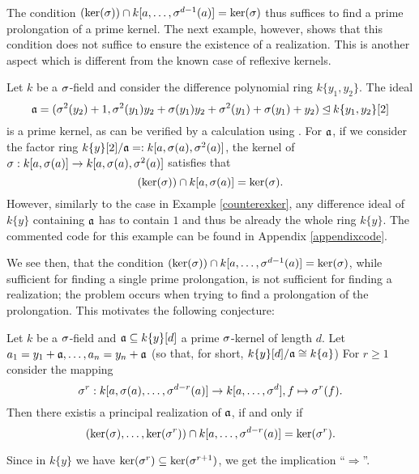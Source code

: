 The condition $(\operatorname{ker}(\sigma)) \cap k[a,\ldots,\sigma^{d-1}(a)] = \operatorname{ker}(\sigma)$ thus suffices to find a prime prolongation of a prime kernel. 
The next example, however, shows that this condition does not suffice to ensure the existence of a realization. This is another aspect which is different from the known case of reflexive kernels.


\begin{ex}\label{secondexamplem2}
Let $k$ be a $\sigma$-field and consider the difference polynomial ring $k\{y_1,y_2\}$. 
The ideal $$\mathfrak{a} = (\sigma^2(y_2)+1,\sigma^2(y_1)y_2 + \sigma(y_1)y_2 + \sigma^2(y_1) + \sigma(y_1) + y_2) \unlhd k\{y_1,y_2\}[2]$$ is a prime kernel,
as can be verified by a calculation using \cite{M2}. For $\mathfrak{a}$, if we consider the factor ring 
$k\{y\}[2]/\mathfrak{a} =: k[a,\sigma(a),\sigma^2(a)]$, the kernel of $\sigma: k[a,\sigma(a)] \rightarrow k[a,\sigma(a),\sigma^2(a)]$
satisfies that $$(\operatorname{ker}(\sigma)) \cap k[a,\sigma(a)] = \operatorname{ker}(\sigma).$$ However, similarly to the case in Example \ref{counterexker}, any difference ideal of $k\{y\}$ containing 
$\mathfrak{a}$ has to contain $1$ and thus be already the whole ring $k\{y\}$. The commented code for this example can be found in Appendix \ref{appendixcode}.
\end{ex}

We see then, that the condition $(\operatorname{ker}(\sigma)) \cap k[a,\ldots,\sigma^{d-1}(a)] = \operatorname{ker}(\sigma)$, while sufficient for finding a single prime prolongation,
is not sufficient for finding a realization; the problem occurs when trying to find a prolongation of the prolongation. This motivates the following conjecture:

\begin{conj}
Let $k$ be a $\sigma$-field and $\mathfrak{a} \subseteq k\{y\}[d]$ a prime $\sigma$-kernel of length $d$.
Let $a_1 = y_1 + \mathfrak{a} ,\ldots,a_n = y_n + \mathfrak{a}$ (so that, for short, $k\{y\}[d]/\mathfrak{a} \cong k\{a\}$)
For $r \geq 1$ consider the mapping 
\[ \sigma^r : k[a,\sigma(a),\ldots,\sigma^{d-r}(a)] \rightarrow k[a,\ldots,\sigma^{d}], f \mapsto \sigma^r(f). \]
Then there existis a principal realization of $\mathfrak{a}$, if and only if 
\begin{equation*} (\operatorname{ker}(\sigma),\ldots,\operatorname{ker}(\sigma^r)) \cap k[a,\ldots,\sigma^{d-r}(a)] = \operatorname{ker}(\sigma^r). \end{equation*}
\end{conj}

Since in $k\{y\}$ we have $\operatorname{ker}(\sigma^r) \subseteq \operatorname{ker}(\sigma^{r+1})$, we get the implication ``$\Rightarrow$''. 




